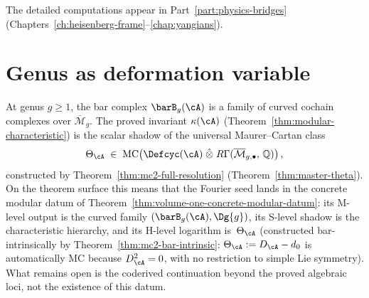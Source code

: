\noindent
The detailed computations appear in Part~\ref{part:physics-bridges}
(Chapters~\ref{ch:heisenberg-frame}--\ref{chap:yangians}).


\section{Genus as deformation variable}\label{sec:fourier-genus}

\begin{remark}
\label{rem:fourier-genus-preview}
At genus $g \geq 1$, the bar complex $\barB_g(\cA)$ is a family of
curved cochain complexes over $\overline{\mathcal{M}}_g$. The proved
invariant $\kappa(\cA)$
(Theorem~\ref{thm:modular-characteristic}) is the scalar shadow of the
universal Maurer--Cartan class
\begin{equation}\label{eq:fourier-theta-preview}
\Theta_{\cA} \;\in\;
\mathrm{MC}\!\left(
 \Defcyc(\cA) \;\hat{\otimes}\;
 R\Gamma(\overline{\mathcal{M}}_{g,\bullet},\, \mathbb{Q})
\right),
\end{equation}
constructed by Theorem~\ref{thm:mc2-full-resolution}
(Theorem~\ref{thm:master-theta}).
On the theorem surface this means that the Fourier seed lands in the
concrete modular datum of
Theorem~\ref{thm:volume-one-concrete-modular-datum}: its M-level
output is the curved family $(\barB_g(\cA), \Dg{g})$, its S-level
shadow is the characteristic hierarchy, and its H-level logarithm
is~$\Theta_{\cA}$ (constructed bar-intrinsically by
Theorem~\ref{thm:mc2-bar-intrinsic}: $\Theta_{\cA} := D_{\cA} - d_0$
is automatically MC because $D_{\cA}^2 = 0$, with no restriction to
simple Lie symmetry). What remains open is the coderived
continuation beyond the proved algebraic loci, not the existence of
this datum.
\end{remark}
